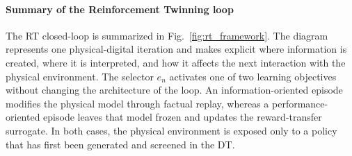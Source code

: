 \documentclass[journal]{IEEEtran}
\begin{document}
\paragraph*{Summary of the Reinforcement Twinning loop}
The RT closed-loop is summarized in Fig.~\ref{fig:rt_framework}. The diagram represents one physical-digital iteration and makes explicit where information is created, where it is interpreted, and how it affects the next interaction with the physical environment. The selector $e_n$ activates one of two learning objectives without changing the architecture of the loop. An information-oriented episode modifies the physical model through factual replay, whereas a performance-oriented episode leaves that model frozen and updates the reward-transfer surrogate. In both cases, the physical environment is exposed only to a policy that has first been generated and screened in the DT.
\end{document}
